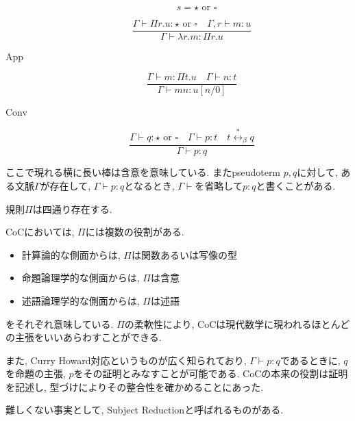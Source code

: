 \documentclass[12pt, titlepage]{ltjsarticle}
\begin{document}
\begin{defn}
\begin{description}
\[             \quad
             s = {\star} \text{ or } {\square} \]
  \item[\lambda] \[ \frac{\Gamma \vdash \Pi r. u {\colon} {\star} \text{ or } {\square} \quad \Gamma, r \vdash m : u}{\Gamma \vdash \lambda r. m {\colon} \Pi r. u} \]
  \item[App] \[ \frac{\Gamma \vdash m : \Pi t. u \quad \Gamma \vdash n : t}{\Gamma \vdash m n {\colon} u[n/0]} \]
  \item[Conv] \[\frac{\Gamma \vdash q {\colon} {\star} \text{ or } {\square} \quad \Gamma \vdash p {\colon} t \quad t \overset{*}{\leftrightarrow}_\beta q}{\Gamma \vdash p {\colon} q} \]
 \end{description}
 ここで現れる横に長い棒は含意を意味している. またpseudoterm $p, q$に対して, ある文脈$\Gamma$が存在して, $\Gamma \vdash p : q$となるとき, $\Gamma \vdash$を省略して$p : q$と書くことがある.
\end{defn}

\begin{rem}
 規則$\Pi$は四通り存在する.
\end{rem}

CoCにおいては, $\Pi$には複数の役割がある.
\begin{itemize}
 \item 計算論的な側面からは, $\Pi$は関数あるいは写像の型
 \item 命題論理学的な側面からは, $\Pi$は含意
 \item 述語論理学的な側面からは, $\Pi$は述語
\end{itemize}
をそれぞれ意味している. $\Pi$の柔軟性により, CoCは現代数学に現われるほとんどの主張をいいあらわすことができる.

また, Curry Howard対応というものが広く知られており, $\Gamma \vdash p : q$であるときに, $q$を命題の主張, $p$をその証明とみなすことが可能である. CoCの本来の役割は証明を記述し, 型づけによりその整合性を確かめることにあった.


難しくない事実として, Subject Reductionと呼ばれるものがある.
\end{document}
